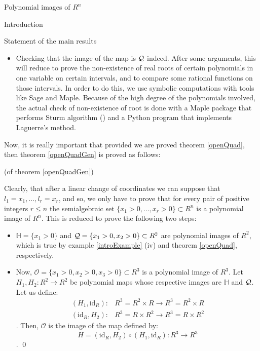 \documentclass[11pt, a4paper, english, twoside, notitlepage]{report}
\begin{document}
\begin{chapter}{Polynomial images of $R^n$}
\begin{section}{Introduction}
\begin{subsection}{Statement of the main results}
\begin{itemize}
		\item Checking that the image of the map is $\mathcal{Q}$ indeed. After some arguments, this will reduce to prove the non-existence of real roots of certain polynomials in one variable on certain intervals, and to compare some rational functions on those intervals. In order to do this, we use symbolic computations with tools like Sage and Maple. Because of the high degree of the polynomials involved, the actual check of non-existence of root is done with a Maple package that performs Sturm algorithm (\cite[1.2.10]{bcr}) and a Python program that implements Laguerre's method.
				
	\end{itemize}

		Now, it is really important that provided we are proved theorem \ref{openQuad}, then theorem \ref{openQuadGen} is proved as follows:
		
		\begin{Proof}(of theorem \ref{openQuadGen})
			
			Clearly, that after a linear change of coordinates we can suppose that $l_1=x_1,\dots,l_r=x_r$, and so, we only have to prove that for every pair of positive integers $r\leq n$ the semialgebraic set $\{x_1>0,\dots,x_r>0\}\subset R^n$ is a polynomial image of $ R^n$. This is reduced to prove the following two steps:
			
			\begin{itemize}
				
				\item $\mathbb{H}=\{x_1>0\}$ and $\mathcal{Q}=\{x_1>0,x_2>0\}\subset R^2$ are polynomial images of $R^2$, which is true by example \ref{introExample} (iv) and theorem \ref{openQuad}, respectively.
				
				\item Now, $\mathcal{O}=\{x_1>0,x_2>0,x_3>0\}\subset R^3$ is a polynomial image of $R^3$.  Let $H_1,H_2:R^2 \rightarrow R^2$ be polynomial maps whose respective images are $\mathbb{H}$ and $\mathcal{Q}$. Let us define:
				\begin{align*}
					(H_1,\text{id}_R):& R^3=R^2\times R\longrightarrow R^3= R^2\times R\\
					(\text{id}_R,H_2):& R^3=R\times R^2\longrightarrow R^3= R\times R^2
				\end{align*}
				. Then, $\mathcal{O}$ is the image of the map defined by:
				$$H=(\text{id}_R,H_2)\circ(H_1,\text{id}_R):R^3\rightarrow R^3$$. \qed
			\end{itemize} 
			

\end{Proof}
\end{subsection}
\end{section}
\end{chapter}
\end{document}
